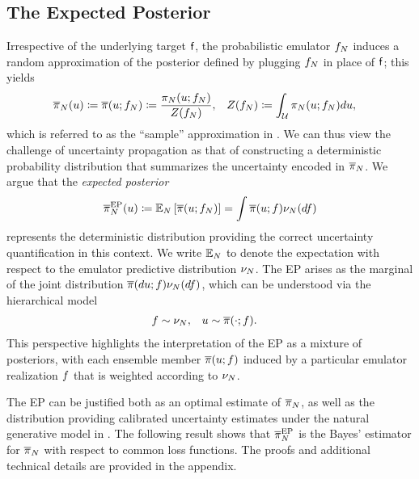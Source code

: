\documentclass[12pt]{article}
\begin{document}
\subsection{The Expected Posterior} \label{sec:EP}
Irrespective of the underlying target $\mathsf{f}$, the probabilistic emulator $f_{N}$ 
induces a random approximation of the posterior defined by plugging $f_{N}$
in place of $\mathsf{f}$; this yields
\begin{align}
\overline{\pi}_{N}(u) \coloneqq \overline{\pi}(u; f_{N}) 
&\coloneqq \frac{\pi_{N}(u; f_{N})}{Z(f_{N})},
&&Z(f_{N}) \coloneqq \int_{\mathcal{U}} \pi_{N}(u; f_{N}) du, \label{eq:random-post}
\end{align}
which is referred to as the ``sample'' approximation in \citet{StuartTeck1}. We can thus
view the challenge of uncertainty propagation as that of constructing a deterministic 
probability distribution that summarizes the uncertainty encoded in $\overline{\pi}_{N}$.
We argue that the \textit{expected posterior}
\begin{equation}
\overline{\pi}_{N}^{\mathrm{EP}}(u) \coloneqq 
\mathbb{E}_{N}\left[\overline{\pi}(u; f_{N}) \right]
= \int \overline{\pi}(u; f) \nu_{N}(df) \label{eq:ep-approx}
\end{equation}
represents the deterministic distribution providing the correct uncertainty quantification 
in this context. We write $\mathbb{E}_{N}$ to denote the expectation with respect to the 
emulator predictive distribution $\nu_{N}$. The EP arises as the marginal of the 
joint distribution $\overline{\pi}(du; f) \nu_{N}(df)$, which 
can be understood via the hierarchical model 
\begin{align}
&f  \sim \nu_{N}, 
&&u \sim \overline{\pi}(\cdot; f).
\label{eq:ep-prob-model}
\end{align}
This perspective highlights the interpretation of the EP as a mixture of posteriors,
with each ensemble member $\overline{\pi}(u; f)$ induced by 
a particular emulator realization $f$ that is weighted according to $\nu_{N}$. 

The EP can be justified both as an optimal estimate of $\overline{\pi}_{N}$, as well as 
the distribution providing calibrated uncertainty estimates under the natural 
generative model in . The following result shows that 
$\overline{\pi}_{N}^{\mathrm{EP}}$ is the Bayes' estimator for $\overline{\pi}_{N}$ with respect to 
common loss functions. The proofs and additional technical details are provided 
in the appendix. 
\end{document}
